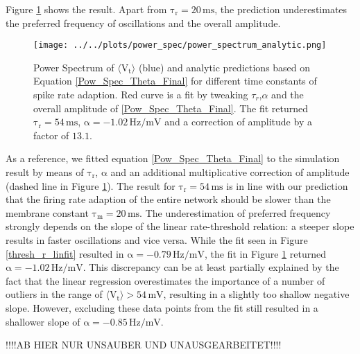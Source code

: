\documentclass[10pt,a4paper]{article}
\begin{document}
Figure \ref{Pow_Spec_Theta_vs_Analytic} shows the result. Apart from $\mathrm{\tau_r = 20\,ms}$, the prediction underestimates the preferred frequency of oscillations and the overall amplitude.   
\begin{figure}
\begin{center}
\texttt{[image: ../../plots/power\_spec/power\_spectrum\_analytic.png]}
\end{center}
\caption{Power Spectrum of $\mathrm{\langle V_t \rangle}$ (blue) and analytic predictions based on Equation \eqref{Pow_Spec_Theta_Final} for different time constants of spike rate adaption. Red curve is a fit by tweaking $\tau_r$,$\alpha$ and the overall amplitude of \eqref{Pow_Spec_Theta_Final}. The fit returned $\mathrm{\tau_r=54\,ms}$, $\mathrm{\alpha=-1.02\,Hz/mV}$ and a correction of amplitude by a factor of $\mathrm{13.1}$.}
\label{Pow_Spec_Theta_vs_Analytic}
\end{figure}
As a reference, we fitted equation \eqref{Pow_Spec_Theta_Final} to the simulation result by means of $\mathrm{\tau_r}$, $\mathrm{\alpha}$ and an additional multiplicative correction of amplitude (dashed line in Figure \ref{Pow_Spec_Theta_vs_Analytic}). The result for $\mathrm{\tau_r=54\,ms}$ is in line with our prediction that the firing rate adaption of the entire network should be slower than the membrane constant $\mathrm{\tau_m=20\,ms}$. The underestimation of preferred frequency strongly depends on the slope of the linear rate-threshold relation: a steeper slope results in faster oscillations and vice versa. While the fit seen in Figure \ref{thresh_r_linfit} resulted in $\mathrm{\alpha=-0.79\,Hz/mV}$, the fit in Figure \ref{Pow_Spec_Theta_vs_Analytic} returned $\mathrm{\alpha=-1.02\,Hz/mV}$. This discrepancy can be at least partially explained by the fact that the linear regression overestimates the importance of a number of outliers in the range of $\mathrm{\langle V_t \rangle > 54\,mV}$, resulting in a slightly too shallow negative slope. However, excluding these data points from the fit still resulted in a shallower slope of $\mathrm{\alpha=-0.85\,Hz/mV}$. 

!!!!AB HIER NUR UNSAUBER UND UNAUSGEARBEITET!!!!
\end{document}
